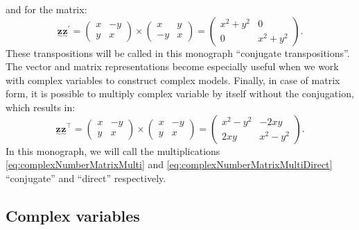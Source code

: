 \documentclass[
]{book}
\begin{document}
and for the matrix:
\begin{equation}
    \underset{\sim}{\boldsymbol{z}} \underset{\sim}{\boldsymbol{z}}^\prime = \begin{pmatrix} x & -y \\ y & x \end{pmatrix} \times \begin{pmatrix} x & y \\ -y & x \end{pmatrix} = 
    \begin{pmatrix} x^2 + y^2 & 0 \\ 0 & x^2 + y^2 \end{pmatrix}.
    \label{eq:complexNumberMatrixMulti}
\end{equation}
These transpositions will be called in this monograph ``conjugate transpositions''. The vector and matrix representations become especially useful when we work with complex variables to construct complex models. Finally, in case of matrix form, it is possible to multiply complex variable by itself without the conjugation, which results in:
\begin{equation}
    \underset{\sim}{\boldsymbol{z}} \underset{\sim}{\boldsymbol{z}}^{\top} = \begin{pmatrix} x & -y \\ y & x \end{pmatrix} \times \begin{pmatrix} x & -y \\ y & x \end{pmatrix} = 
    \begin{pmatrix} x^2 - y^2 & - 2 xy \\ 2 xy & x^2 - y^2 \end{pmatrix}.
    \label{eq:complexNumberMatrixMultiDirect}
\end{equation}
In this monograph, we will call the multiplications \eqref{eq:complexNumberMatrixMulti} and \eqref{eq:complexNumberMatrixMultiDirect} ``conjugate'' and ``direct'' respectively.

\hypertarget{complexVariable}{%
\subsection{Complex variables}\label{complexVariable}}
\end{document}
